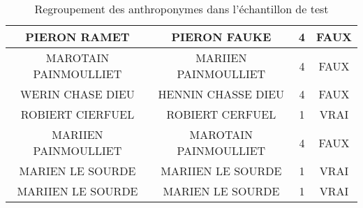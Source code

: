 \begin{table}[ht]
\begin{tabular}{|c|c|c|c|}
\hline	PIERON RAMET	&	PIERON FAUKE	&	4	&	FAUX	\\
\hline	MAROTAIN PAINMOULLIET	&	MARIIEN PAINMOULLIET	&	4	&	FAUX	\\
\hline	WERIN CHASE DIEU	&	HENNIN CHASSE DIEU	&	4	&	FAUX	\\
\hline	ROBIERT CIERFUEL	&	ROBIERT CERFUEL	&	1	&	VRAI	\\
\hline	MARIIEN PAINMOULLIET	&	MAROTAIN PAINMOULLIET	&	4	&	FAUX	\\
\hline	MARIEN LE SOURDE	&	MARIIEN LE SOURDE	&	1	&	VRAI	\\
\hline	MARIIEN LE SOURDE	&	MARIEN LE SOURDE	&	1	&	VRAI	\\
\hline
    \end{tabular}
    \caption{Regroupement des anthroponymes dans l'échantillon de test}
    \label{test_antro}
\end{table}
\normalsize